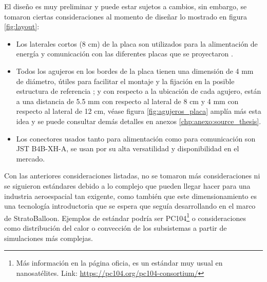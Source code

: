 El diseño es muy preliminar y puede estar sujetos a cambios, sin embargo, se tomaron ciertas consideraciones al momento de diseñar lo mostrado en figura \ref{fig:layout}:
\begin{itemize}
    \item Los laterales cortos (8 cm) de la placa son utilizados para la alimentación de energía y comunicación  con las diferentes placas que se proyectaron \cite{tesis_estructura_stratoballoon}.
    \item Todos los agujeros en los bordes de la placa tienen una dimensión de 4 mm de diámetro, útiles para facilitar el montaje y la fijación en la posible estructura de referencia \cite{tesis_estructura_stratoballoon}; y con respecto a la ubicación de cada agujero, están a una distancia de 5.5 mm con respecto al lateral de 8 cm y 4 mm con respecto al lateral de 12 cm, véase figura \ref{fig:agujeros_placa} amplía más esta idea y se puede consultar demás detalles en anexos \ref{chp:anexo:source_thesis}.

    \item Los conectores usados tanto para alimentación como para comunicación son JST B4B-XH-A, se usan por su alta versatilidad y disponibilidad en el mercado.
\end{itemize}

Con las anteriores consideraciones listadas, no se tomaron más consideraciones ni se siguieron estándares debido a lo complejo que pueden llegar hacer para una industria aeroespacial tan exigente, como también que este dimensionamiento es una tecnología introductoria que se espera que seguía desarrollando en el marco de StratoBalloon. Ejemplos de estándar podría ser PC104\footnote{Más información en la página oficia, es un estándar muy usual en nanosatélites. Link: \url{https://pc104.org/pc104-consortium/}} o consideraciones como distribución del calor o convección de los subsistemas a partir de simulaciones más complejas.  

